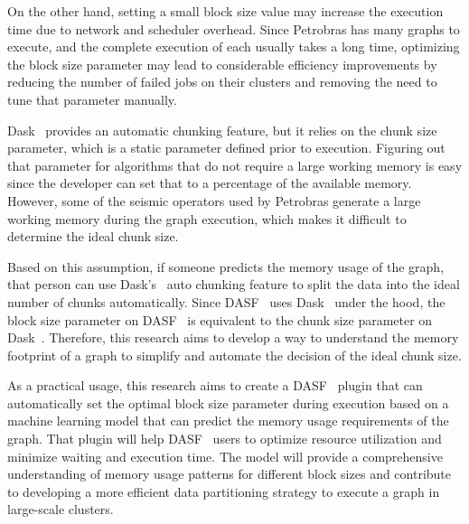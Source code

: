 On the other hand, setting a small block size value may increase the execution time due to network and scheduler overhead.
Since Petrobras has many graphs to execute, and the complete execution of each usually takes a long time, optimizing the block size parameter may lead to considerable efficiency improvements by reducing the number of failed jobs on their clusters and removing the need to tune that parameter manually.

Dask~\cite{dask} provides an automatic chunking feature, but it relies on the chunk size parameter, which is a static parameter defined prior to execution.
Figuring out that parameter for algorithms that do not require a large working memory is easy since the developer can set that to a percentage of the available memory.
However, some of the seismic operators used by Petrobras generate a large working memory during the graph execution, which makes it difficult to determine the ideal chunk size.

Based on this assumption, if someone predicts the memory usage of the graph, that person can use Dask's~\cite{dask} auto chunking feature to split the data into the ideal number of chunks automatically.
Since \ac{DASF}~\cite{dasf} uses Dask~\cite{dask} under the hood, the block size parameter on \ac{DASF}~\cite{dasf} is equivalent to the chunk size parameter on Dask~\cite{dask}.
Therefore, this research aims to develop a way to understand the memory footprint of a graph to simplify and automate the decision of the ideal chunk size.

As a practical usage, this research aims to create a \ac{DASF}~\cite{dasf} plugin that can automatically set the optimal block size parameter during execution based on a machine learning model that can predict the memory usage requirements of the graph.
That plugin will help \ac{DASF}~\cite{dasf} users to optimize resource utilization and minimize waiting and execution time.
The model will provide a comprehensive understanding of memory usage patterns for different block sizes and contribute to developing a more efficient data partitioning strategy to execute a graph in large-scale clusters.
